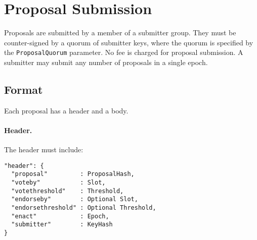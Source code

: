 \newpage
\section{Proposal Submission}
\label{sect:submission}

Proposals are submitted by a member of a submitter group.  They must be counter-signed by a quorum of submitter keys, where the quorum is specified by the \texttt{ProposalQuorum} parameter.
  No fee is charged for proposal
submission.  A submitter may submit
any number of proposals in a single epoch.

\subsection{Format}

Each proposal has a header and a body.  %

\paragraph{Header.} The header must include:

\begin{verbatim}
"header": {
  "proposal"         : ProposalHash,
  "voteby"           : Slot,
  "votethreshold"    : Threshold,
  "endorseby"        : Optional Slot,
  "endorsethreshold" : Optional Threshold,
  "enact"            : Epoch,
  "submitter"        : KeyHash
}
\end{verbatim}

